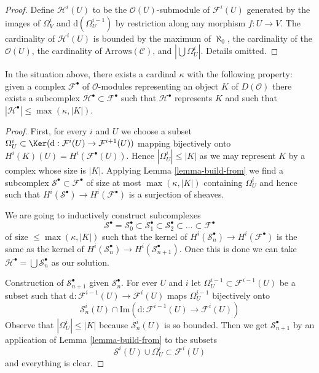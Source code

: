 \begin{proof}
Define $\mathcal{H}^i(U)$ to be the
$\mathcal{O}(U)$-submodule of $\mathcal{F}^i(U)$
generated by the images of $\Omega^i_V$ and $\text{d}(\Omega^{i - 1}_U)$
by restriction along any morphism $f : U \to V$.
The cardinality of $\mathcal{H}^i(U)$ is bounded
by the maximum of $\aleph_0$, the cardinality of the $\mathcal{O}(U)$,
the cardinality of $\text{Arrows}(\mathcal{C})$, and $|\bigcup \Omega^i_U|$.
Details omitted.
\end{proof}

\begin{lemma}
\label{lemma-qis-small}
In the situation above, there exists a cardinal $\kappa$ with the
following property: given a complex $\mathcal{F}^\bullet$ of
$\mathcal{O}$-modules representing an object $K$ of $D(\mathcal{O})$
there exists a subcomplex $\mathcal{H}^\bullet \subset \mathcal{F}^\bullet$
such that $\mathcal{H}^\bullet$ represents $K$ and such that
$|\mathcal{H}^\bullet| \leq \max(\kappa, |K|)$.
\end{lemma}

\begin{proof}
First, for every $i$ and $U$ we choose a subset
$\Omega^i_U \subset \Ker(\text{d} :
\mathcal{F}^i(U) \to \mathcal{F}^{i + 1}(U))$
mapping bijectively onto
$H^i(K)(U) = H^i(\mathcal{F}^\bullet(U))$.
Hence $|\Omega^i_U| \leq |K|$ as we may represent $K$ by
a complex whose size is $|K|$.
Applying Lemma \ref{lemma-build-from}
we find a subcomplex $\mathcal{S}^\bullet \subset \mathcal{F}^\bullet$
of size at most $\max(\kappa, |K|)$ containing $\Omega^i_U$
and hence such that $H^i(\mathcal{S}^\bullet) \to H^i(\mathcal{F}^\bullet)$
is a surjection of sheaves.

\medskip\noindent
We are going to inductively construct subcomplexes
$$
\mathcal{S}^\bullet =
\mathcal{S}_0^\bullet \subset
\mathcal{S}_1^\bullet \subset
\mathcal{S}_2^\bullet \subset \ldots \subset \mathcal{F}^\bullet
$$
of size $\leq \max(\kappa, |K|)$ such that
the kernel of $H^i(\mathcal{S}_n^\bullet) \to H^i(\mathcal{F}^\bullet)$
is the same as the kernel of
$H^i(\mathcal{S}_n^\bullet) \to H^i(\mathcal{S}_{n + 1}^\bullet)$.
Once this is done we can take
$\mathcal{H}^\bullet = \bigcup \mathcal{S}_n^\bullet$ as our solution.

\medskip\noindent
Construction of $\mathcal{S}_{n + 1}^\bullet$ given
$\mathcal{S}_n^\bullet$. For ever $U$ and $i$ let
$\Omega^{i - 1}_U \subset \mathcal{F}^{i - 1}(U)$ be a subset
such that $\text{d} : \mathcal{F}^{i - 1}(U) \to \mathcal{F}^i(U)$
maps $\Omega^{i - 1}_U$ bijectively onto
$$
\mathcal{S}_n^i(U) \cap
\text{Im}(\text{d} : \mathcal{F}^{i - 1}(U)\to \mathcal{F}^i(U))
$$
Observe that $|\Omega^i_U| \leq |K|$ because $\mathcal{S}_n^i(U)$
is so bounded. Then we get $\mathcal{S}_{n + 1}^\bullet$ by an
application of Lemma \ref{lemma-build-from} to the subsets
$$
\mathcal{S}^i(U) \cup \Omega^i_U \subset \mathcal{F}^i(U)
$$
and everything is clear.
\end{proof}

